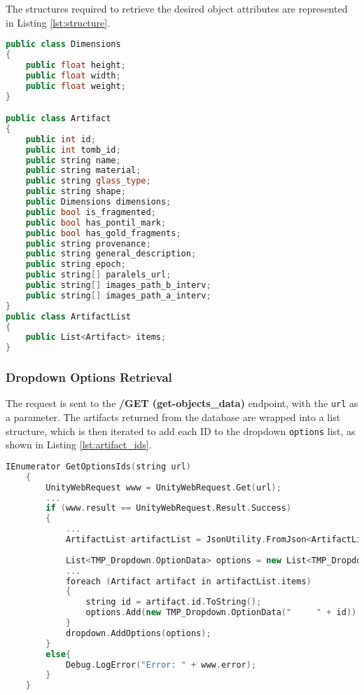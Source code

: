 The structures required to retrieve the desired object attributes are represented in Listing \ref{lst:structure}.

\begin{lstlisting}[language=C++, caption={Artifact Structure to extract responses.}, label={lst:structure}]
public class Dimensions
{
    public float height;
    public float width;
    public float weight;
}

public class Artifact
{
    public int id;
    public int tomb_id;
    public string name;
    public string material;
    public string glass_type;
    public string shape;
    public Dimensions dimensions;
    public bool is_fragmented;
    public bool has_pontil_mark;
    public bool has_gold_fragments;
    public string provenance;
    public string general_description;
    public string epoch;
    public string[] paralels_url;
    public string[] images_path_b_interv;
    public string[] images_path_a_interv;
}
public class ArtifactList
{
    public List<Artifact> items;
}
\end{lstlisting}

\subsubsection{Dropdown Options Retrieval}
\label{sec:options}
The request is sent to the \textbf{/GET (get-objects\_data)} endpoint, with the \texttt{url} as a parameter.
The artifacts returned from the database are wrapped into a list structure, which is then iterated to add each ID to the dropdown \texttt{options} list, as shown in Listing \ref{lst:artifact_ids}.

\begin{lstlisting}[language=C++, caption={Method used to load artifact IDs and define as options in the Dropdown.}, label={lst:artifact_ids}]
      IEnumerator GetOptionsIds(string url)
    {
        UnityWebRequest www = UnityWebRequest.Get(url);
        ...
        if (www.result == UnityWebRequest.Result.Success)
        {
            ...
            ArtifactList artifactList = JsonUtility.FromJson<ArtifactList>(wrappedJson);
            
            List<TMP_Dropdown.OptionData> options = new List<TMP_Dropdown.OptionData>();
            ...
            foreach (Artifact artifact in artifactList.items)
            {
                string id = artifact.id.ToString();
                options.Add(new TMP_Dropdown.OptionData("     " + id));
            }
            dropdown.AddOptions(options);
        }
        else{
            Debug.LogError("Error: " + www.error);
        }
    }
\end{lstlisting}


